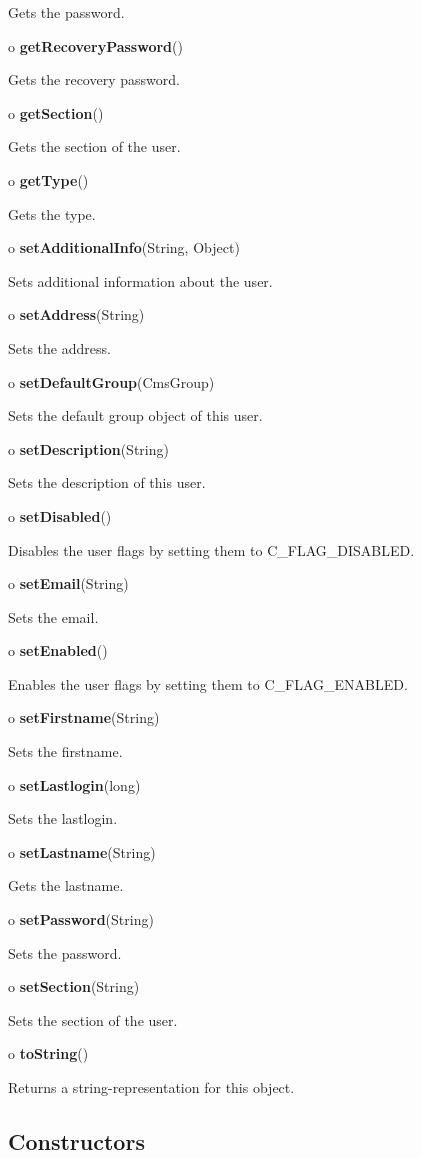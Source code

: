 \begin{description}
Gets the password.  
\item o {\bf getRecoveryPassword}()  

Gets the recovery password.  
\item o {\bf getSection}()  

Gets the section of the user.  
\item o {\bf getType}()  

Gets the type.  
\item o {\bf setAdditionalInfo}(String, Object)  

Sets additional information about the user.  
\item o {\bf setAddress}(String)  

Sets the address.  
\item o {\bf setDefaultGroup}(CmsGroup)  

Sets the default group object of this user.  
\item o {\bf setDescription}(String)  

Sets the description of this user.  
\item o {\bf setDisabled}()  

Disables the user flags by setting them to C\_FLAG\_DISABLED.  
\item o {\bf setEmail}(String)  

Sets the email.  
\item o {\bf setEnabled}()  

Enables the user flags by setting them to C\_FLAG\_ENABLED.  
\item o {\bf setFirstname}(String)  

Sets the firstname.  
\item o {\bf setLastlogin}(long)  

Sets the lastlogin.  
\item o {\bf setLastname}(String)  

Gets the lastname.  
\item o {\bf setPassword}(String)  

Sets the password.  
\item o {\bf setSection}(String)  

Sets the section of the user.  
\item o {\bf toString}()  

Returns a string-representation for this object. 
\end{description}

\subsection*{  Constructors }

